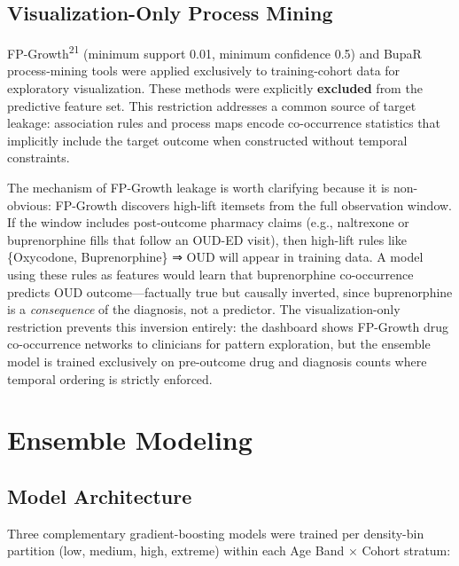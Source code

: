 \documentclass[
  12pt,
]{book}
\begin{document}
\subsection{Visualization-Only Process
Mining}\label{visualization-only-process-mining}

FP-Growth\textsuperscript{21} (minimum support 0.01, minimum confidence
0.5) and BupaR process-mining tools were applied exclusively to
training-cohort data for exploratory visualization. These methods were
explicitly \textbf{excluded} from the predictive feature set. This
restriction addresses a common source of target leakage: association
rules and process maps encode co-occurrence statistics that implicitly
include the target outcome when constructed without temporal
constraints.

The mechanism of FP-Growth leakage is worth clarifying because it is
non-obvious: FP-Growth discovers high-lift itemsets from the full
observation window. If the window includes post-outcome pharmacy claims
(e.g., naltrexone or buprenorphine fills that follow an OUD-ED visit),
then high-lift rules like \{Oxycodone, Buprenorphine\} ⇒ OUD will appear
in training data. A model using these rules as features would learn that
buprenorphine co-occurrence predicts OUD outcome---factually true but
causally inverted, since buprenorphine is a \emph{consequence} of the
diagnosis, not a predictor. The visualization-only restriction prevents
this inversion entirely: the dashboard shows FP-Growth drug
co-occurrence networks to clinicians for pattern exploration, but the
ensemble model is trained exclusively on pre-outcome drug and diagnosis
counts where temporal ordering is strictly enforced.

\section{Ensemble Modeling}\label{sec-models}

\subsection{Model Architecture}\label{model-architecture}

Three complementary gradient-boosting models were trained per
density-bin partition (low, medium, high, extreme) within each Age Band
× Cohort stratum:
\end{document}
